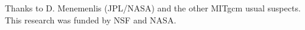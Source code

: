 \documentclass[grl]{agutex2015}
\begin{document}
\begin{article}
\begin{acknowledgments}
Thanks to D. Menemenlis (JPL/NASA) and the other MITgcm usual suspects.
This research was funded by NSF and NASA.
\end{acknowledgments}

%
%
%
%
%
%
%
%
%





%
%
%
%


\end{article}
\end{document}
